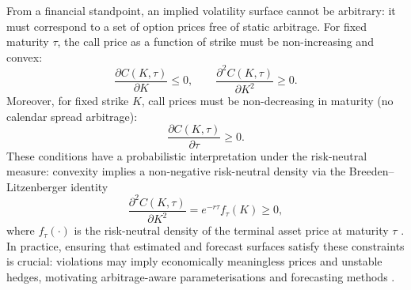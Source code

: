 From a financial standpoint, an implied volatility surface cannot be arbitrary: it must correspond to a set of option prices free of static arbitrage. For fixed maturity $\tau$, the call price as a function of strike must be non-increasing and convex:
\begin{equation}
\frac{\partial C(K,\tau)}{\partial K}\le 0,
\qquad
\frac{\partial^2 C(K,\tau)}{\partial K^2}\ge 0.
\end{equation}
Moreover, for fixed strike $K$, call prices must be non-decreasing in maturity (no calendar spread arbitrage):
\begin{equation}
\frac{\partial C(K,\tau)}{\partial \tau}\ge 0.
\end{equation}
These conditions have a probabilistic interpretation under the risk-neutral measure: convexity implies a non-negative risk-neutral density via the Breeden--Litzenberger identity
\begin{equation}
\frac{\partial^2 C(K,\tau)}{\partial K^2}=e^{-r\tau} f_{\tau}(K)\ge 0,
\end{equation}
where $f_{\tau}(\cdot)$ is the risk-neutral density of the terminal asset price at maturity $\tau$ \cite{BreLit:78}. In practice, ensuring that estimated and forecast surfaces satisfy these constraints is crucial: violations may imply economically meaningless prices and unstable hedges, motivating arbitrage-aware parameterisations and forecasting methods \cite{Gat:06,Fen:05}.

